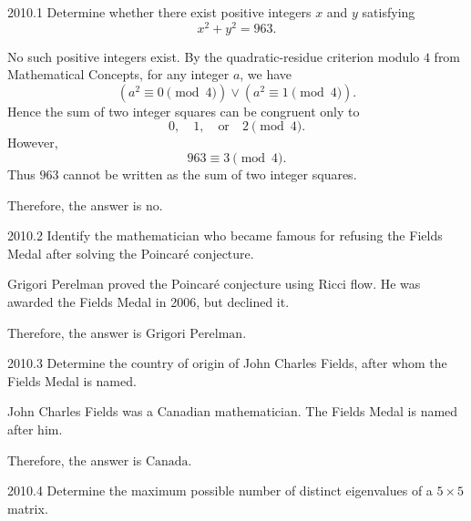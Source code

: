     \begin{pastproblem}{2010.1}
        Determine whether there exist positive integers $x$ and $y$ satisfying
        \[
            x^2+y^2=963.
        \]
    \end{pastproblem}

    \begin{solution}
        No such positive integers exist. By the quadratic-residue criterion modulo $4$ from Mathematical Concepts, for any integer $a$, we have
        \[
            (a^2\equiv 0\pmod{4})\lor(a^2\equiv 1\pmod{4}).
        \]
        Hence the sum of two integer squares can be congruent only to
        \[
            0,\quad 1,\quad \text{or}\quad 2\pmod{4}.
        \]
        However,
        \[
            963\equiv 3\pmod{4}.
        \]
        Thus $963$ cannot be written as the sum of two integer squares.

        Therefore, the answer is $\boxed{\text{no}}$.
    \end{solution}

    \begin{pastproblem}{2010.2}
        Identify the mathematician who became famous for refusing the Fields Medal after solving the
        Poincar\'e conjecture.
    \end{pastproblem}

    \begin{solution}
        Grigori Perelman proved the Poincar\'e conjecture using Ricci flow. He was awarded the
        Fields Medal in 2006, but declined it.

        Therefore, the answer is $\boxed{\text{Grigori Perelman}}$.
    \end{solution}

    \begin{pastproblem}{2010.3}
        Determine the country of origin of John Charles Fields, after whom the Fields Medal is
        named.
    \end{pastproblem}

    \begin{solution}
        John Charles Fields was a Canadian mathematician. The Fields Medal is named after him.

        Therefore, the answer is $\boxed{\text{Canada}}$.
    \end{solution}

    \begin{pastproblem}{2010.4}
        Determine the maximum possible number of distinct eigenvalues of a $5\times 5$ matrix.
    \end{pastproblem}

